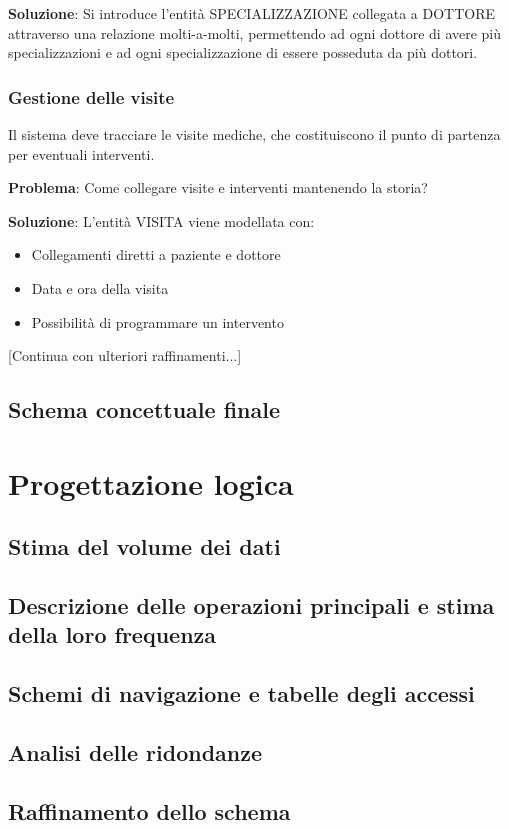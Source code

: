 \documentclass[12pt,a4paper]{report}
\begin{document}
\textbf{Soluzione}: Si introduce l'entità SPECIALIZZAZIONE collegata a DOTTORE attraverso una relazione molti-a-molti, permettendo ad ogni dottore di avere più specializzazioni e ad ogni specializzazione di essere posseduta da più dottori.

\subsection{Gestione delle visite}
Il sistema deve tracciare le visite mediche, che costituiscono il punto di partenza per eventuali interventi.

\textbf{Problema}: Come collegare visite e interventi mantenendo la storia?

\textbf{Soluzione}: L'entità VISITA viene modellata con:
\begin{itemize}
\item Collegamenti diretti a paziente e dottore
\item Data e ora della visita
\item Possibilità di programmare un intervento
\end{itemize}

[Continua con ulteriori raffinamenti...]
\section{Schema concettuale finale}

\chapter{Progettazione logica}
\section{Stima del volume dei dati}
\section{Descrizione delle operazioni principali e stima della loro frequenza}
\section{Schemi di navigazione e tabelle degli accessi}
\section{Analisi delle ridondanze}
\section{Raffinamento dello schema}
\end{document}
